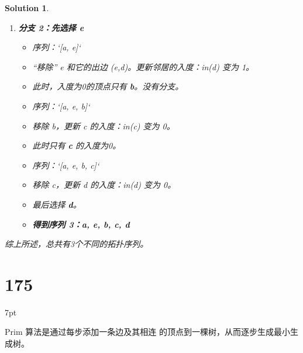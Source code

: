 \documentclass[UTF8]{report}
\newtheorem{solution}{Solution}
\theoremstyle{MyLineTheoremStyle} %
\theoremstyle{MyBlockTheoremStyle} %
\theoremstyle{MySubsubsectionStyle} %
\newenvironment{graybox}{%
        \def\FrameCommand{%
        \hspace{1pt}%
        {\color{gray}\small \vrule width 2pt}%
        {\color{graybox_color}\vrule width 4pt}%
        \colorbox{graybox_color}%
        }%
        \MakeFramed{\advance\hsize-\width\FrameRestore}%
        \noindent\hspace{-4.55pt}%
        \begin{adjustwidth}{}{7pt}%
        \vspace{2pt}\vspace{2pt}%
        }
        {%
        \vspace{2pt}\end{adjustwidth}\endMakeFramed%
        }
\begin{document}
\begin{solution}
\begin{enumerate}
    \item \textbf{分支 2：先选择 e}
    \begin{itemize}
        \item 序列：`[a, e]`
        \item “移除” e 和它的出边 (e,d)。更新邻居的入度：in(d) 变为 1。
        \item 此时，入度为0的顶点只有 \textbf{b}。没有分支。
        \item 序列：`[a, e, b]`
        \item 移除 b，更新 c 的入度：in(c) 变为 0。
        \item 此时只有 \textbf{c} 的入度为0。
        \item 序列：`[a, e, b, c]`
        \item 移除 c，更新 d 的入度：in(d) 变为 0。
        \item 最后选择 \textbf{d}。
        \item \textbf{得到序列 3：a, e, b, c, d}
    \end{itemize}
\end{enumerate}

综上所述，总共有3个不同的拓扑序列。
\end{solution}


\section*{175}
\begin{graybox}
Prim 算法是通过每步添加一条边及其相连
的顶点到一棵树，从而逐步生成最小生成树。
\end{graybox}
\end{document}
